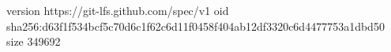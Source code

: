version https://git-lfs.github.com/spec/v1
oid sha256:d63f1f534bcf5c70d6c1f62c6d11f0458f404ab12df3320c6d4477753a1dbd50
size 349692
